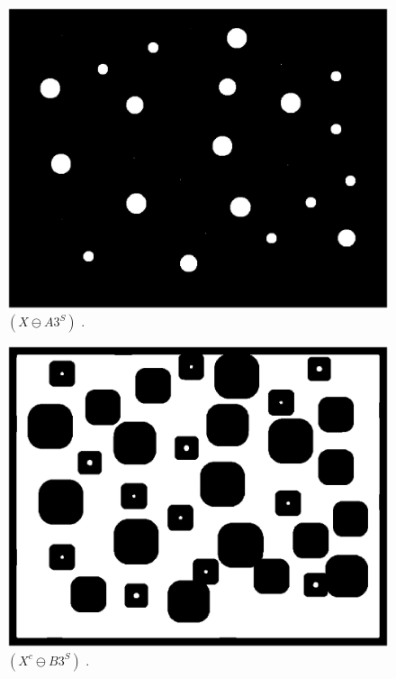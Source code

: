 \documentclass[paper=a4, fontsize=11pt]{scrartcl}
\begin{document}
\begin{figure}
	\centering
	\includegraphics[width=12cm]{XsubAs.eps}
	\caption{ $( X \ominus A3^S)$ .}
	\label{fig:12}
\end{figure}

\begin{figure}
	\centering
	\includegraphics[width=12cm]{XcsubBs.eps}
	\caption{ $( X^c \ominus B3^S)$ .}
	\label{fig:13}
\end{figure}
\end{document}
